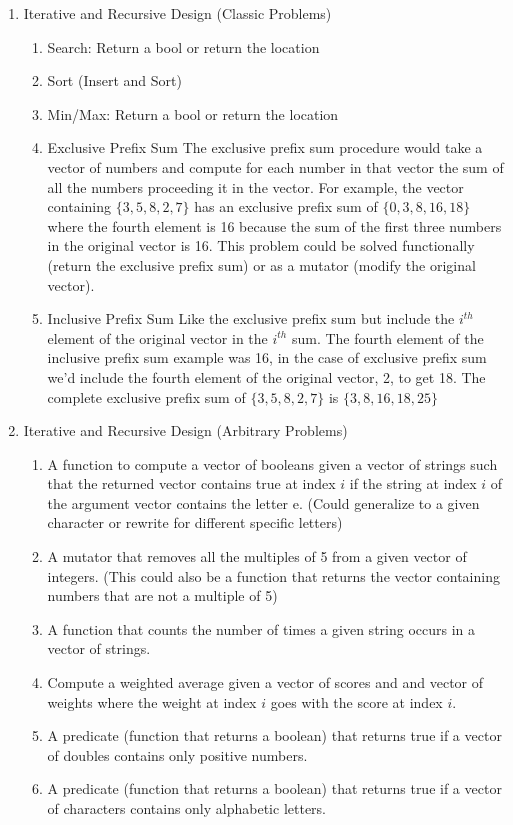 \documentclass[nobib]{tufte-handout}
\begin{document}
\begin{enumerate}
\item Iterative and Recursive Design (Classic Problems)
\begin{enumerate}
  \item Search: Return a bool or return the location
  \item Sort (Insert and Sort)
  \item Min/Max: Return a bool or return the location
  \item Exclusive Prefix Sum \newline
  The exclusive prefix sum procedure would take a vector of numbers and compute for each number in that vector the sum of all the numbers proceeding it in the vector. For example, the vector containing \( \{3,5,8,2,7 \} \) has an exclusive prefix sum of \( \{ 0,3,8,16,18 \} \) where the fourth element is 16 because the sum of the first three numbers in the original vector is 16. This problem could be solved functionally (return the exclusive prefix sum) or as a mutator (modify the original vector).
  \item Inclusive Prefix Sum \newline
  Like the exclusive prefix sum but include the \(i^{th}\) element of the original vector in the \(i^{th}\) sum. The fourth element of the inclusive prefix sum example was 16, in the case of exclusive prefix sum we'd include the fourth element of the original vector, 2, to get 18. The complete exclusive prefix sum of \( \{3,5,8,2,7 \} \) is
  \( \{3,8,16,18,25 \} \)
\end{enumerate}
\item Iterative and Recursive Design (Arbitrary Problems)
\begin{enumerate}
  \item A function to compute a vector of booleans given a vector of strings such that the returned vector contains true at index \( i \) if the string at index \(i\) of the argument vector contains the letter e. (Could generalize to a given character or rewrite for different specific letters)
  \item A mutator that removes all the multiples of 5 from a given vector of integers. (This could also be a function that returns the vector containing numbers that are not a multiple of 5)
  \item A function that counts the number of times a given string occurs in a vector of strings.
  \item Compute a weighted average given a vector of scores and and vector of weights where the weight at index \(i\) goes with the score at index \(i\).
  \item A predicate (function that returns a boolean) that returns true if a vector of doubles contains only positive numbers.
  \item A predicate (function that returns a boolean) that returns true if a vector of characters contains only alphabetic letters.
\end{enumerate}

\end{enumerate}
\end{document}
